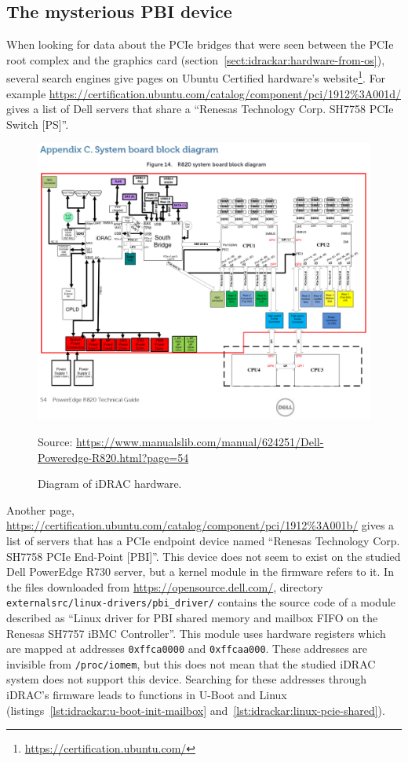 \subsection{The mysterious PBI device}

When looking for data about the PCIe bridges that were seen between the PCIe root complex and the graphics card (section~\ref{sect:idrackar:hardware-from-os}), several search engines give pages on Ubuntu Certified hardware's website\footnote{\url{https://certification.ubuntu.com/}}.
For example \url{https://certification.ubuntu.com/catalog/component/pci/1912%3A001d/} gives a list of Dell servers that share a ``Renesas Technology Corp. SH7758 PCIe Switch [PS]''.

\begin{figure}[ht]
  \centering
  \includegraphics[width=\textwidth]{03-idrackar/img/dell-poweredge-r820-hw.png}
  \caption{Diagram of iDRAC hardware.}
  \label{fig:idrackar:idrac-hardware-diagram}
  {\scriptsize Source: \url{https://www.manualslib.com/manual/624251/Dell-Poweredge-R820.html?page=54}}\vspace*{-.3cm} %
\end{figure}

Another page, \url{https://certification.ubuntu.com/catalog/component/pci/1912%3A001b/} gives a list of servers that has a PCIe endpoint device named ``Renesas Technology Corp. SH7758 PCIe End-Point [PBI]''.
This device does not seem to exist on the studied Dell PowerEdge R730 server, but a kernel module in the firmware refers to it.
In the files downloaded from \url{https://opensource.dell.com/}, directory \texttt{externalsrc/linux-drivers/pbi\_driver/} contains the source code of a module described as ``Linux driver for PBI shared memory and mailbox FIFO on the Renesas SH7757 iBMC Controller''.
This module uses hardware registers which are mapped at addresses \texttt{0xffca0000} and \texttt{0xffcaa000}.
These addresses are invisible from \texttt{/proc/iomem}, but this does not mean that the studied iDRAC system does not support this device.
Searching for these addresses through iDRAC's firmware leads to functions in U-Boot and Linux (listings~\ref{lst:idrackar:u-boot-init-mailbox} and~\ref{lst:idrackar:linux-pcie-shared}).

